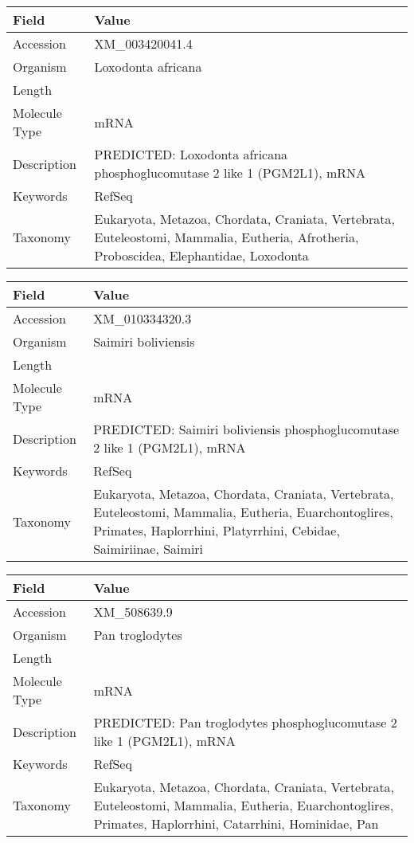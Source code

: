 \documentclass[10pt]{article}
\begin{document}
{\footnotesize
\begin{longtable}{>{\raggedright\arraybackslash}p{4.5cm} >{\raggedright\arraybackslash}p{11.5cm}}
\textbf{Field} & \textbf{Value} \\
\hline
Accession & XM\_003420041.4 \\
Organism & Loxodonta africana \\
Length & 5289 \\
Molecule Type & mRNA \\
Description & PREDICTED: Loxodonta africana phosphoglucomutase 2 like 1 (PGM2L1), mRNA \\
Keywords & RefSeq \\
Taxonomy & Eukaryota, Metazoa, Chordata, Craniata, Vertebrata, Euteleostomi, Mammalia, Eutheria, Afrotheria, Proboscidea, Elephantidae, Loxodonta \\
\end{longtable}
}

{\footnotesize
\begin{longtable}{>{\raggedright\arraybackslash}p{4.5cm} >{\raggedright\arraybackslash}p{11.5cm}}
\textbf{Field} & \textbf{Value} \\
\hline
Accession & XM\_010334320.3 \\
Organism & Saimiri boliviensis \\
Length & 4657 \\
Molecule Type & mRNA \\
Description & PREDICTED: Saimiri boliviensis phosphoglucomutase 2 like 1 (PGM2L1), mRNA \\
Keywords & RefSeq \\
Taxonomy & Eukaryota, Metazoa, Chordata, Craniata, Vertebrata, Euteleostomi, Mammalia, Eutheria, Euarchontoglires, Primates, Haplorrhini, Platyrrhini, Cebidae, Saimiriinae, Saimiri \\
\end{longtable}
}

{\footnotesize
\begin{longtable}{>{\raggedright\arraybackslash}p{4.5cm} >{\raggedright\arraybackslash}p{11.5cm}}
\textbf{Field} & \textbf{Value} \\
\hline
Accession & XM\_508639.9 \\
Organism & Pan troglodytes \\
Length & 8555 \\
Molecule Type & mRNA \\
Description & PREDICTED: Pan troglodytes phosphoglucomutase 2 like 1 (PGM2L1), mRNA \\
Keywords & RefSeq \\
Taxonomy & Eukaryota, Metazoa, Chordata, Craniata, Vertebrata, Euteleostomi, Mammalia, Eutheria, Euarchontoglires, Primates, Haplorrhini, Catarrhini, Hominidae, Pan \\
\end{longtable}
}
\end{document}
